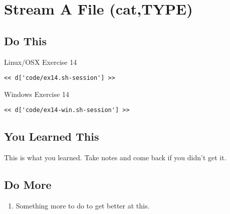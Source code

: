 \chapter{Stream A File (cat,TYPE)}

\section{Do This}

\begin{code}{Linux/OSX Exercise 14}
\begin{Verbatim}
<< d['code/ex14.sh-session'] >>
\end{Verbatim}
\end{code}

\begin{code}{Windows Exercise 14}
\begin{Verbatim}
<< d['code/ex14-win.sh-session'] >>
\end{Verbatim}
\end{code}

\section{You Learned This}

This is what you learned.  Take notes and come back if you didn't get it.

\section{Do More}

\begin{enumerate}
\item Something more to do to get better at this.
\end{enumerate}

